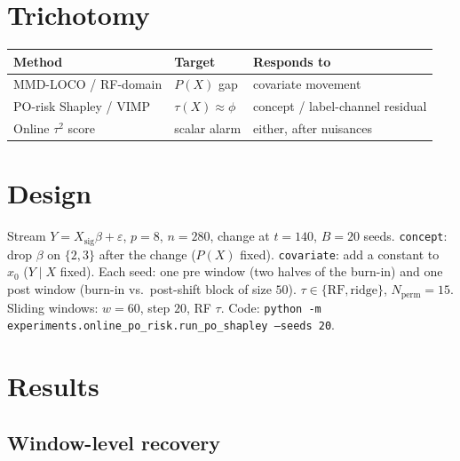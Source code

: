 \documentclass[11pt]{article}
\begin{document}
\section{Trichotomy}

\begin{center}
\begin{tabular}{lll}
\toprule
Method & Target & Responds to \\
\midrule
MMD-LOCO / RF-domain & $P(X)$ gap & covariate movement \\
PO-risk Shapley / VIMP & $\tau(X)\approx\phi$ & concept / label-channel residual \\
Online $\tau^2$ score & scalar alarm & either, after nuisances \\
\bottomrule
\end{tabular}
\end{center}

\section{Design}

Stream $Y=X_{\mathrm{sig}}\beta+\varepsilon$, $p{=}8$, $n{=}280$,
change at $t{=}140$, $B{=}20$ seeds.
\texttt{concept}: drop $\beta$ on $\{2,3\}$ after the change ($P(X)$ fixed).
\texttt{covariate}: add a constant to $x_0$ ($Y\mid X$ fixed).
Each seed: one pre window (two halves of the burn-in) and one post
window (burn-in vs.\ post-shift block of size $50$).
$\tau\in\{\mathrm{RF},\mathrm{ridge}\}$, $N_{\mathrm{perm}}{=}15$.
Sliding windows: $w{=}60$, step $20$, RF $\tau$.
Code: \texttt{python -m experiments.online\_po\_risk.run\_po\_shapley --seeds 20}.

\section{Results}

\subsection{Window-level recovery}
\end{document}

